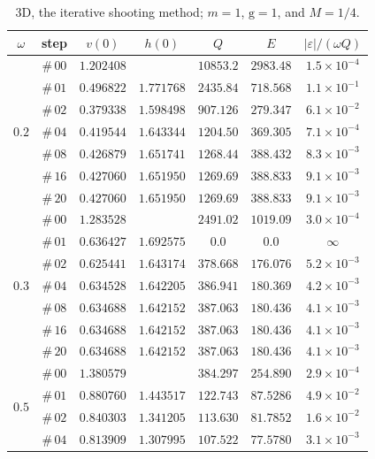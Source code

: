 \documentclass[12pt]{extarticle}
\newcommand{\coupling}{\mathrm{g}}
\theoremstyle{plain}
\theoremstyle{remark}
\begin{document}
\begin{table}[!ht]
\begin{center}
\caption{\footnotesize
3D, the iterative shooting method; $m=1$, $\coupling=1$, and $M=1/4$.
}
\begin{tabular}{ccccccc} \toprule
$\omega$ & step & $v(0)$ & $h(0)$ & $Q$ & $E$ & $|\varepsilon|/(\omega Q)$\\
\midrule
\multirow{7}{*}{$0.2$} & $\#\,00$ & $1.202408$ &  & $10853.2$ & $2983.48$ & $1.5\times10^{-4}$ \\
 & $\#\,01$ & $0.496822$ & $1.771768$ & $2435.84$ & $718.568$ & $1.1\times10^{-1}$ \\
 & $\#\,02$ & $0.379338$ & $1.598498$ & $907.126$ & $279.347$ & $6.1\times10^{-2}$ \\
 & $\#\,04$ & $0.419544$ & $1.643344$ & $1204.50$ & $369.305$ & $7.1\times10^{-4}$ \\
 & $\#\,08$ & $0.426879$ & $1.651741$ & $1268.44$ & $388.432$ & $8.3\times10^{-3}$ \\
 & $\#\,16$ & $0.427060$ & $1.651950$ & $1269.69$ & $388.833$ & $9.1\times10^{-3}$ \\
 & $\#\,20$ & $0.427060$ & $1.651950$ & $1269.69$ & $388.833$ & $9.1\times10^{-3}$ \\
\midrule
\multirow{7}{*}{$0.3$} & $\#\,00$ & $1.283528$ &  & $2491.02$ & $1019.09$ & $3.0\times10^{-4}$ \\
 & $\#\,01$ & $0.636427$ & $1.692575$ & $0.0$ & $0.0$ & $\infty$ \\
 & $\#\,02$ & $0.625441$ & $1.643174$ & $378.668$ & $176.076$ & $5.2\times10^{-3}$ \\
 & $\#\,04$ & $0.634528$ & $1.642205$ & $386.941$ & $180.369$ & $4.2\times10^{-3}$ \\
 & $\#\,08$ & $0.634688$ & $1.642152$ & $387.063$ & $180.436$ & $4.1\times10^{-3}$ \\
 & $\#\,16$ & $0.634688$ & $1.642152$ & $387.063$ & $180.436$ & $4.1\times10^{-3}$ \\
 & $\#\,20$ & $0.634688$ & $1.642152$ & $387.063$ & $180.436$ & $4.1\times10^{-3}$ \\
\midrule
\multirow{7}{*}{$0.5$} & $\#\,00$ & $1.380579$ &  & $384.297$ & $254.890$ & $2.9\times10^{-4}$ \\
 & $\#\,01$ & $0.880760$ & $1.443517$ & $122.743$ & $87.5286$ & $4.9\times10^{-2}$ \\
 & $\#\,02$ & $0.840303$ & $1.341205$ & $113.630$ & $81.7852$ & $1.6\times10^{-2}$ \\
 & $\#\,04$ & $0.813909$ & $1.307995$ & $107.522$ & $77.5780$ & $3.1\times10^{-3}$ \\

\end{tabular}
\end{center}
\end{table}
\end{document}
